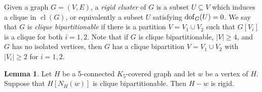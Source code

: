 \documentclass[11pt,a4paper]{article}
\theoremstyle{definition}
\newtheorem{lemma}[theorem]{Lemma}
\DeclareMathOperator{\cl}{cl}
\newcommand{\dof}{{\rm dof}}
\begin{document}
    Given a graph  $G=(V,E)$, a {\em rigid cluster} of $G$ is a subset $U\subseteq V$ which induces a clique in $\cl(G)$, or equivalently  a subset $U$ satisfying $\dof_G(U)=0$. We say that $G$ is 
    {\it clique bipartitionable} if
there is a partition $V=V_1\cup V_2$ such that $G[V_i]$ is a clique
for both $i=1,2$. Note that if $G$ is clique bipartitionable, $|V|\geq 4$,
and $G$ has no isolated vertices, then $G$ has a  clique bipartition $V=V_1\cup V_2$
with $|V_i|\geq 2$ for $i=1,2$.


\begin{lemma}\label{lem:canbecovered}
    Let $H$ be a 5-connected $K_5$-covered graph  and let $w$ be a vertex of $H$. 
    Suppose that  $H[N_{H}(w)]$
    is clique bipartitionable.
    Then $H-w$ is rigid.
\end{lemma}
\end{document}

